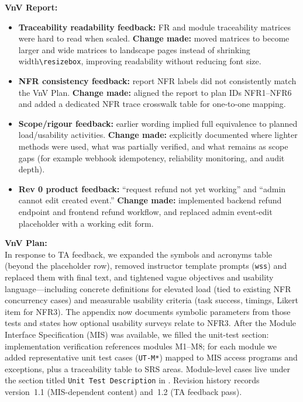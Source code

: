 \documentclass{article}
\begin{document}
\noindent\textbf{VnV Report:}
\begin{itemize}
\item \textbf{Traceability readability feedback:} FR and module traceability matrices were hard to read when scaled. \textbf{Change made:} moved matrices to become larger and wide matrices to landscape pages instead of shrinking width\texttt{\textbackslash resizebox}, improving readability without reducing font size.
\item \textbf{NFR consistency feedback:} report NFR labels did not consistently match the VnV Plan. \textbf{Change made:} aligned the report to plan IDs NFR1--NFR6 and added a dedicated NFR trace crosswalk table for one-to-one mapping.
\item \textbf{Scope/rigour feedback:} earlier wording implied full equivalence to planned load/usability activities. \textbf{Change made:} explicitly documented where lighter methods were used, what was partially verified, and what remains as scope gaps (for example webhook idempotency, reliability monitoring, and audit depth).
\item \textbf{Rev 0 product feedback:} ``request refund not yet working'' and ``admin cannot edit created event.'' \textbf{Change made:} implemented backend refund endpoint and frontend refund workflow, and replaced admin event-edit placeholder with a working edit form.
\end{itemize}

\noindent\textbf{VnV Plan:}\\
In response to TA feedback, we expanded the symbols and acronyms table
(beyond the placeholder row), removed instructor template prompts (\texttt{wss}) and replaced them
with final text, and tightened vague objectives and usability language---including concrete definitions
for elevated load (tied to existing NFR concurrency cases) and measurable usability criteria (task
success, timings, Likert item for NFR3). The appendix now documents symbolic parameters from those
tests and states how optional usability surveys relate to NFR3. After the Module Interface
Specification (MIS) was available, we filled the unit-test section: implementation verification
references modules M1--M8; for each module we added representative unit test cases (\texttt{UT-M*})
mapped to MIS access programs and exceptions, plus a traceability table to SRS areas.
Module-level cases live under the section titled \texttt{Unit Test Description} in .
Revision history records version~1.1 (MIS-dependent content) and~1.2 (TA feedback pass).\\
\end{document}
